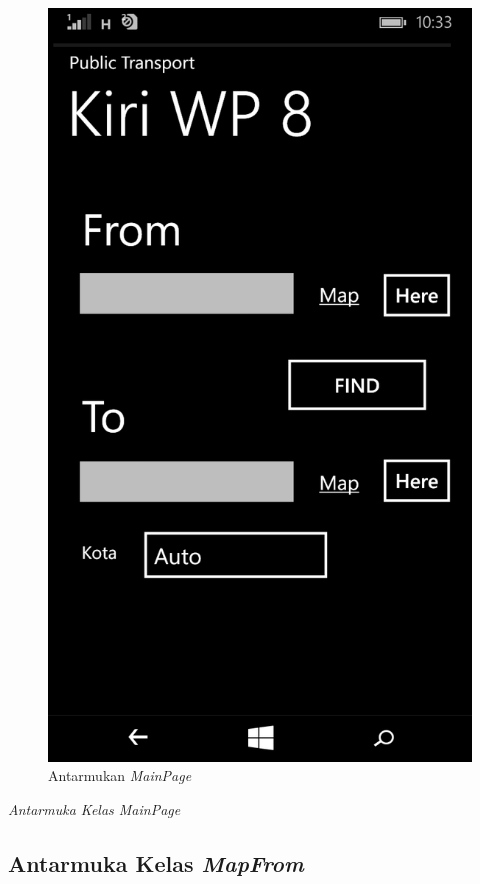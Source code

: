 \begin{figure}[h]
	\centering
		\includegraphics[scale=0.2]{Gambar/antarmuka/home}
	\caption{Antarmukan \textit{MainPage}}
	\label{fig:Antarmuka MainPage}
\end{figure}

\hspace{0.5cm} \textit{Antarmuka Kelas MainPage} 

\subsection{Antarmuka Kelas \textit{MapFrom}}
\label{lab:Antarmuka Kelas MapFrom}

